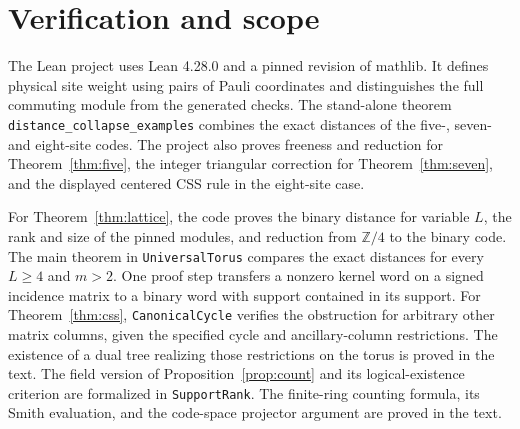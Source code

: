 \documentclass[11pt]{article}
\newcommand{\Z}{\mathbb Z}
\begin{document}
\section{Verification and scope}
The Lean project uses Lean 4.28.0 and a pinned revision of mathlib. It defines physical site weight using pairs of Pauli coordinates and distinguishes the full commuting module from the generated checks. The stand-alone theorem \texttt{distance\_collapse\_examples} combines the exact distances of the five-, seven- and eight-site codes. The project also proves freeness and reduction for Theorem~\ref{thm:five}, the integer triangular correction for Theorem~\ref{thm:seven}, and the displayed centered CSS rule in the eight-site case.

For Theorem~\ref{thm:lattice}, the code proves the binary distance for variable $L$, the rank and size of the pinned modules, and reduction from $\Z/4$ to the binary code. The main theorem in \texttt{UniversalTorus} compares the exact distances for every $L\ge4$ and $m>2$. One proof step transfers a nonzero kernel word on a signed incidence matrix to a binary word with support contained in its support. For Theorem~\ref{thm:css}, \texttt{CanonicalCycle} verifies the obstruction for arbitrary other matrix columns, given the specified cycle and ancillary-column restrictions. The existence of a dual tree realizing those restrictions on the torus is proved in the text. The field version of Proposition~\ref{prop:count} and its logical-existence criterion are formalized in \texttt{SupportRank}. The finite-ring counting formula, its Smith evaluation, and the code-space projector argument are proved in the text.
\end{document}
